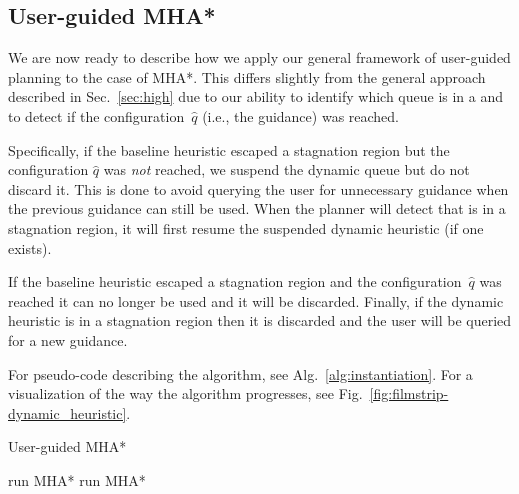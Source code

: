 \documentclass[conference]{IEEEtran}
\begin{document}
\subsection{User-guided MHA*}
\label{sec:instantiation}
We are now ready to describe how we apply our general framework of user-guided planning to the case of MHA*.
This differs slightly from the general approach described in Sec.~\ref{sec:high} due to our ability to identify which queue is in a \noindent  and to detect if the configuration~$\hat{q}$ (i.e., the guidance) was reached.

Specifically, if the baseline heuristic escaped a stagnation region but the configuration $\hat{q}$ was \emph{not} reached, we suspend the dynamic queue but do not discard it. 
This is done to avoid querying the user for unnecessary guidance when the previous guidance can still be used.
When the planner will detect that is in a stagnation region, it will first resume the suspended dynamic heuristic (if one exists).

If the baseline heuristic escaped a stagnation region and the configuration~$\hat{q}$ was  reached it can no longer be used and it will be discarded.
Finally, if the dynamic heuristic is in a stagnation region then it is discarded and the user will be queried for a new guidance. 

For pseudo-code describing the algorithm, see Alg.~\ref{alg:instantiation}.
For a visualization of the way the algorithm progresses, see Fig.~\ref{fig:filmstrip-dynamic_heuristic}.
%


\begin{algorithm}[tb]
\caption{User-guided MHA*}
\label{alg:instantiation}	
\begin{algorithmic}[1]
\small
{} 
		\State run MHA*
	\EndWhile
%	
\vspace{2mm}
%
	\Else
	\EndIf
%	
\vspace{2mm}
%
		\State run MHA*
	\EndWhile
%	
\vspace{2mm}
%	
	\Else 	{}
		\Else
		\EndIf
	\EndIf

\EndWhile
\end{algorithmic}
\end{algorithm}
\end{document}
